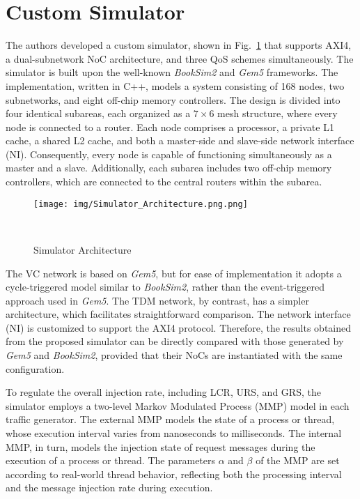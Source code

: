 \section{Custom Simulator}
The authors developed a custom simulator, shown in Fig.~\ref{fig:simulator_architecture} that supports AXI4, a dual-subnetwork NoC architecture, and three QoS schemes simultaneously. The simulator is built upon the well-known \textit{BookSim2} and \textit{Gem5} frameworks.
The implementation, written in C++, models a system consisting of 168 nodes, two subnetworks, and eight off-chip memory controllers. The design is divided into four identical subareas, each organized as a $7 \times 6$ mesh structure, where every node is connected to a router.
Each node comprises a processor, a private L1 cache, a shared L2 cache, and both a master-side and slave-side network interface (NI). Consequently, every node is capable of functioning simultaneously as a master and a slave. Additionally, each subarea includes two off-chip memory controllers, which are connected to the central routers within the subarea.

\begin{figure}[htbp]
    \centering
    \texttt{[image: img/Simulator\_Architecture.png.png]}
    \caption{Simulator Architecture}~\cite{abderazek_multicore_2013}\label{fig:simulator_architecture}
\end{figure}

The VC network is based on \textit{Gem5}, but for ease of implementation it adopts a cycle-triggered model similar to \textit{BookSim2}, rather than the event-triggered approach used in \textit{Gem5}. The TDM network, by contrast, has a simpler architecture, which facilitates straightforward comparison. 
The network interface (NI) is customized to support the AXI4 protocol. 
Therefore, the results obtained from the proposed simulator can be directly compared with those generated by \textit{Gem5} and \textit{BookSim2}, provided that their NoCs are instantiated with the same configuration.

To regulate the overall injection rate, including LCR, URS, and GRS, the simulator employs a two-level Markov Modulated Process (MMP) model in each traffic generator. The external MMP models the state of a process or thread, whose execution interval varies from nanoseconds to milliseconds. The internal MMP, in turn, models the injection state of request messages during the execution of a process or thread. The parameters $\alpha$ and $\beta$ of the MMP are set according to real-world thread behavior, reflecting both the processing interval and the message injection rate during execution. 

